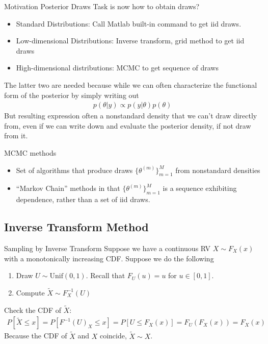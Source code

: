 \documentclass[aspectratio=169, handout]{beamer}
\begin{document}
{\footnotesize
\begin{frame}{Motivation Posterior Draws}
Task is now \alert{how to obtain draws}?
\begin{itemize}
  \item Standard Distributions:
    Call Matlab built-in command to get iid draws.
  \item Low-dimensional Distributions:
    Inverse transform, grid method to get iid draws
  \item High-dimensional distributions: MCMC to get sequence of
    draws
\end{itemize}
The latter two are needed because while we can often characterize the
\alert{functional form} of the posterior by simply writing out
\begin{align*}
  p(\theta|y)\propto p(y|\theta)p(\theta)
\end{align*}
But resulting expression often a \alert{nonstandard} density that we
can't draw directly from, even if we can \alert{write down} and
\alert{evaluate} the posterior density, if not draw from it.

MCMC methods
\begin{itemize}
  \item Set of algorithms that produce draws $\{\theta^{(m)}\}_{m=1}^M$
    from nonstandard densities
  \item ``Markov Chain'' methods in that $\{\theta^{(m)}\}_{m=1}^M$ is a
    \alert{sequence} exhibiting dependence, rather than a set of
    iid draws.
\end{itemize}
\end{frame}
}


\subsection{Inverse Transform Method}

{\footnotesize
\begin{frame}{Sampling by Inverse Transform}
Suppose we have a continuous RV $X\sim F_X(x)$ with a monotonically
increasing CDF. Suppose we do the following
\begin{enumerate}
  \item Draw $U\sim \text{Unif}(0,1)$.
    Recall that $F_U(u)=u$ for $u\in[0,1]$.
  \item Compute $\tilde{X}\sim F^{-1}_X(U)$
\end{enumerate}
Check the CDF of $\tilde{X}$:
\begin{align*}
  P[\tilde{X}\leq x]
  =
  P[F^{-1}(U)_X\leq x]
  =
  P[U\leq F_X(x)]
  =
  F_U(F_X(x))
  =
  F_X(x)
\end{align*}
Because the CDF of $\tilde{X}$ and $X$ coincide,
$\tilde{X}\sim X$.
\end{frame}
}
\end{document}
